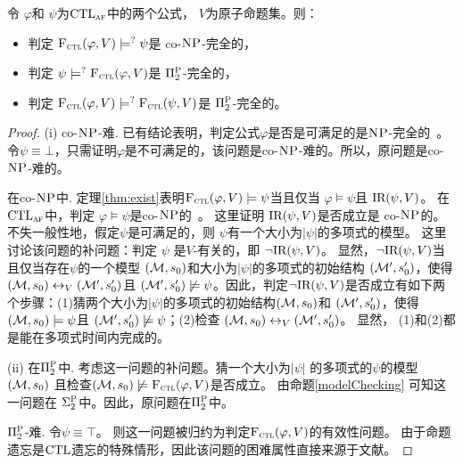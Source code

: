 \begin{theorem}[Entailment]
	\label{thm:comF}
	令 $\varphi$和 $\psi$为$\textrm{CTL}_{\textsc{a} \textsc{f}}$中的两个公式， $V$为原子命题集。则：
	\begin{itemize}
		\item[(i)] 判定  ${\textsc{F}_{\textsc{ctl}}}(\varphi, V ) \models^? \psi$是 co-$\textsc{NP}$-完全的，
		\item[(ii)] 判定  $\psi \models^? {\textsc{F}_{\textsc{ctl}}}(\varphi, V)$是 $\Pi_2^{\textsc{P}}$-完全的，
		\item[(iii)] 判定 ${\textsc{F}_{\textsc{ctl}}}(\varphi, V) \models^? {\textsc{F}_{\textsc{ctl}}}(\psi, V)$是 $\Pi_2^{\textsc{P}}$-完全的。
	\end{itemize}
\end{theorem}
\begin{proof}
	(i) co-$\textsc{NP}$-难. 已有结论表明，判定公式$\varphi$是否是可满足的是$\textsc{NP}$-完全的~\cite{meier2009complexity}。令$\psi \equiv \bot$，只需证明$\varphi$是不可满足的，该问题是co-$\textsc{NP}$-难的。所以，原问题是co-$\textsc{NP}$-难的。
	
	在co-$\textsc{NP}$中. 定理\ref{thm:exist}表明${\textsc{F}_{\textsc{ctl}}}(\varphi, V) \models \psi$当且仅当 $\varphi \models \psi$且 $\textrm{IR}(\psi, V)$。
	在$\textrm{CTL}_{\textsc{a} \textsc{f}}$中，判定 $\varphi \models \psi$是co-$\textsc{NP}$的~\cite{meier2009complexity}。
	这里证明 $\textrm{IR}(\psi, V)$是否成立是 co-$\textsc{NP}$的。不失一般性地，假定$\psi$是可满足的，则 $\psi$有一个大小为$|\psi|$的多项式的模型。
	这里讨论该问题的补问题：判定 $\psi$ 是$V$-有关的，即 $\neg \textrm{IR}(\psi, V)$。 显然，$\neg \textrm{IR}(\psi, V)$当且仅当存在$\psi$的一个模型 $({\cal M},s_0)$和大小为$|\psi|$的多项式的初始结构 $({\cal M}',s_0')$，使得 $({\cal M},s_0) \leftrightarrow_V ({\cal M}',s_0')$且 $({\cal M}',s_0') \not \models \psi$。因此，判定$\neg \textrm{IR}(\psi, V)$是否成立有如下两个步骤：(1)猜两个大小为$|\psi|$的多项式的初始结构$({\cal M},s_0)$和 $({\cal M}',s_0')$，使得 $({\cal M},s_0) \models \psi$且 $({\cal M}',s_0') \not \models \psi$；(2)检查 $({\cal M},s_0) \leftrightarrow_V ({\cal M}',s_0')$。
	显然， (1)和(2)都是能在多项式时间内完成的。
	
	(ii) 在$\Pi_2^{\textsc{P}}$中. 考虑这一问题的补问题。猜一个大小为$|\psi|$ 的多项式的$\psi$的模型$({\cal M},s_0)$ 且检查$({\cal M}, s_0) \not \models {\textsc{F}_{\textsc{ctl}}}(\varphi, V)$是否成立。
	由命题\ref{modelChecking} 可知这一问题在 $\Sigma_2^{\textsc{P}}$中。因此，原问题在$\Pi_2^{\textsc{P}}$中。
	
	$\Pi_2^{\textsc{P}}$-难. 令$\psi \equiv \top$。 则这一问题被归约为判定${\textsc{F}_{\textsc{ctl}}}(\varphi, V)$的有效性问题。
	由于命题遗忘是$\textrm{CTL}$遗忘的特殊情形，因此该问题的困难属性直接来源于文献\cite{DBLP:journals/jair/LangLM03}。
	

\end{proof}
